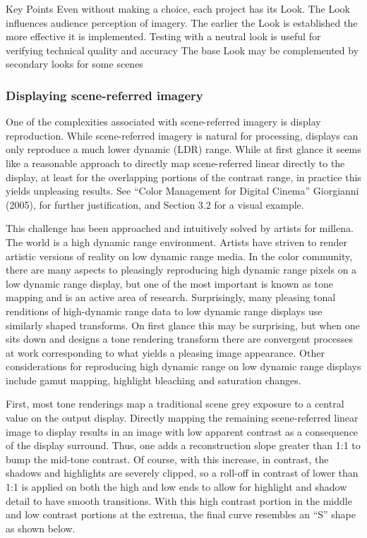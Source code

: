 Key Points
Even without making a choice, each project has its Look.
The Look influences audience perception of imagery.
The earlier the Look is established the more effective it is implemented.
Testing with a neutral look is useful for verifying technical quality and accuracy
The base Look may be complemented by secondary looks for some scenes


\subsubsection{Displaying scene-referred imagery}

One of the complexities associated with scene-referred imagery is display reproduction. While scene-referred imagery is natural for processing, displays can only reproduce a much lower dynamic (LDR) range. While at first glance it seems like a reasonable approach to directly map scene-referred linear directly to the display, at least for the overlapping portions of the contrast range, in practice this yields unpleasing results. See “Color Management for Digital Cinema” Giorgianni (2005), for further justification, and Section 3.2 for a visual example.

This challenge has been approached and intuitively solved by artists for millena. The world is a high dynamic range environment. Artists have striven to render artistic versions of reality on low dynamic  range media.  In the color community, there are many aspects to pleasingly reproducing high dynamic range pixels on a low dynamic range display, but one of the most important is known as tone mapping and is an active area of research. Surprisingly, many pleasing tonal renditions of high-dynamic range data to low dynamic range displays use similarly shaped transforms. On first glance this may be surprising, but when one sits down and designs a tone rendering transform there are convergent processes at work corresponding to what yields a pleasing image appearance. Other considerations for reproducing high dynamic range on low dynamic range displays include gamut mapping, highlight bleaching and saturation changes.

First, most tone renderings map a traditional scene grey exposure to a central value on the output display. Directly mapping the remaining scene-referred linear image to display results in an image with low apparent contrast as a consequence of the display surround. Thus, one adds a reconstruction slope greater than 1:1 to bump the mid-tone contrast.  Of course, with this increase, in contrast, the shadows and highlights are severely clipped, so a roll-off in contrast of lower than 1:1 is applied on both the high and low ends to allow for highlight and shadow detail to have smooth transitions. With this high contrast portion in the middle and low contrast portions at the extrema, the final curve resembles an “S” shape as shown below.

